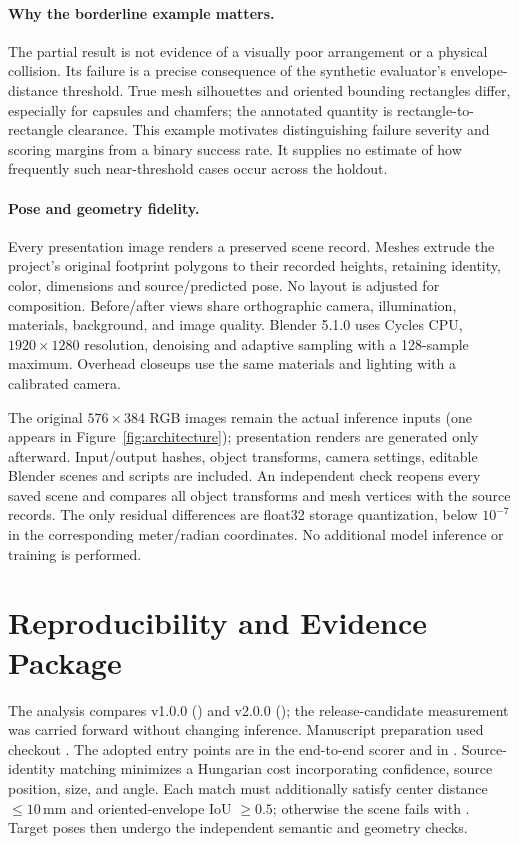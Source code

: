 \paragraph{Why the borderline example matters.}
The partial result is not evidence of a visually poor arrangement or a physical collision. Its failure is a precise consequence of the synthetic evaluator's envelope-distance threshold. True mesh silhouettes and oriented bounding rectangles differ, especially for capsules and chamfers; the annotated quantity is rectangle-to-rectangle clearance. This example motivates distinguishing failure severity and scoring margins from a binary success rate. It supplies no estimate of how frequently such near-threshold cases occur across the holdout.

\paragraph{Pose and geometry fidelity.}
Every presentation image renders a preserved scene record. Meshes extrude the project's original footprint polygons to their recorded heights, retaining identity, color, dimensions and source/predicted pose. No layout is adjusted for composition. Before/after views share orthographic camera, illumination, materials, background, and image quality. Blender 5.1.0 uses Cycles CPU, $1920\times1280$ resolution, denoising and adaptive sampling with a 128-sample maximum. Overhead closeups use the same materials and lighting with a calibrated camera.

The original $576\times384$ RGB images remain the actual inference inputs (one appears in Figure~\ref{fig:architecture}); presentation renders are generated only afterward. Input/output hashes, object transforms, camera settings, editable Blender scenes and scripts are included. An independent check reopens every saved scene and compares all object transforms and mesh vertices with the source records. The only residual differences are float32 storage quantization, below $10^{-7}$ in the corresponding meter/radian coordinates. No additional model inference or training is performed.

\clearpage
\section{Reproducibility and Evidence Package}
\label{app:reproducibility}
The analysis compares v1.0.0 () and v2.0.0 (); the release-candidate measurement was carried forward without changing inference. Manuscript preparation used checkout . The adopted entry points are  in the end-to-end scorer and  in . Source-identity matching minimizes a Hungarian cost incorporating confidence, source position, size, and angle. Each match must additionally satisfy center distance $\leq10$\,mm and oriented-envelope IoU $\geq0.5$; otherwise the scene fails with . Target poses then undergo the independent semantic and geometry checks.

